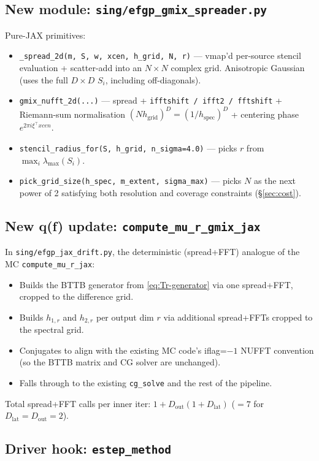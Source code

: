 \documentclass[11pt]{article}
\newcommand{\code}[1]{\texttt{\small #1}}
\begin{document}
\subsection{New module: \code{sing/efgp\_gmix\_spreader.py}}

Pure-JAX primitives:
\begin{itemize}
\item \code{\_spread\_2d(m, S, w, xcen, h\_grid, N, r)} --- vmap'd
per-source stencil evaluation + scatter-add into an $N{\times}N$
complex grid.  Anisotropic Gaussian (uses the full $D{\times}D$
$S_i$, including off-diagonals).
\item \code{gmix\_nufft\_2d(...)} --- spread + \code{ifftshift /
ifft2 / fftshift} + Riemann-sum normalisation $(N h_{\text{grid}})^D
= (1/h_{\text{spec}})^D$ + centering phase $e^{2\pi i \xi^\top
xcen}$.
\item \code{stencil\_radius\_for(S, h\_grid, n\_sigma=4.0)} --- picks
$r$ from $\max_i \lambda_{\max}(S_i)$.
\item \code{pick\_grid\_size(h\_spec, m\_extent, sigma\_max)} --- picks
$N$ as the next power of 2 satisfying both resolution and coverage
constraints (\S\ref{sec:cost}).
\end{itemize}

\subsection{New q(f) update: \code{compute\_mu\_r\_gmix\_jax}}

In \code{sing/efgp\_jax\_drift.py}, the deterministic (spread+FFT)
analogue of the MC \code{compute\_mu\_r\_jax}:
\begin{itemize}
\item Builds the BTTB generator from \eqref{eq:Tr-generator} via one
spread+FFT, cropped to the difference grid.
\item Builds $h_{1,r}$ and $h_{2,r}$ per output dim $r$ via additional
spread+FFTs cropped to the spectral grid.
\item Conjugates to align with the existing MC code's iflag=$-1$
NUFFT convention (so the BTTB matrix and CG solver are unchanged).
\item Falls through to the existing \code{cg\_solve} and the rest of
the pipeline.
\end{itemize}
Total spread+FFT calls per inner iter: $1 + D_{\text{out}}(1 +
D_{\text{lat}})$ ($= 7$ for $D_{\text{lat}} = D_{\text{out}} = 2$).

\subsection{Driver hook: \code{estep\_method}}
\end{document}
